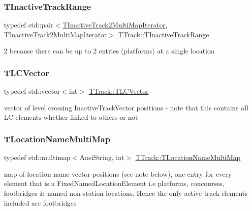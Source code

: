 \subsubsection{\texorpdfstring{T\+Inactive\+Track\+Range}{TInactiveTrackRange}}
{\footnotesize\ttfamily typedef std\+::pair$<$\mbox{\hyperlink{class_t_track_a6072881896a545945cbcc26e8307bb68}{T\+Inactive\+Track2\+Multi\+Map\+Iterator}}, \mbox{\hyperlink{class_t_track_a6072881896a545945cbcc26e8307bb68}{T\+Inactive\+Track2\+Multi\+Map\+Iterator}}$>$ \mbox{\hyperlink{class_t_track_a1ac6dda244b2f5a6e27a458f28fc1b1c}{T\+Track\+::\+T\+Inactive\+Track\+Range}}}

\textquotesingle{}2\textquotesingle{} because there can be up to 2 entries (platforms) at a single location \mbox{\label{class_t_track_a84634d4f5d5ce1928526e8be27e74a72}} 
\subsubsection{\texorpdfstring{T\+L\+C\+Vector}{TLCVector}}
{\footnotesize\ttfamily typedef std\+::vector$<$int$>$ \mbox{\hyperlink{class_t_track_a84634d4f5d5ce1928526e8be27e74a72}{T\+Track\+::\+T\+L\+C\+Vector}}}

vector of level crossing Inactive\+Track\+Vector positions -\/ note that this contains all LC elements whether linked to others or not \mbox{\label{class_t_track_ac68eed5a26013072d6852aa2e6d6f33d}} 
\subsubsection{\texorpdfstring{T\+Location\+Name\+Multi\+Map}{TLocationNameMultiMap}}
{\footnotesize\ttfamily typedef std\+::multimap$<$Ansi\+String, int$>$ \mbox{\hyperlink{class_t_track_ac68eed5a26013072d6852aa2e6d6f33d}{T\+Track\+::\+T\+Location\+Name\+Multi\+Map}}}

map of location name vector positions (see note below), one entry for every element that is a Fixed\+Named\+Location\+Element i.\+e platforms, concourses, footbridges \& named non-\/station locations. Hence the only active track elements included are footbridges 

